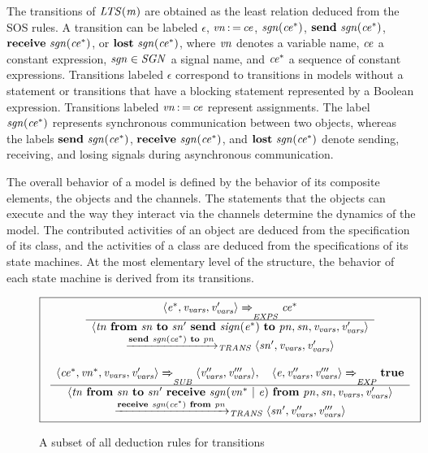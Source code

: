 The transitions of $\it{LTS}(m)$ are obtained as the least relation deduced from the SOS rules.
A transition can be labeled $\epsilon$, $\it{vn\operatorname*{:=}ce}$, $\it{sgn}(\it{ce^*})$, $\textbf{send}~\it{sgn}(\it{ce^*})$, $\textbf{receive}~\it{sgn}(\it{ce^*})$, or $\textbf{lost}~\it{sgn}(\it{ce^*})$, where $\it{vn}$ denotes a variable name, $\it{ce}$ a constant expression, $\it{sgn} \in \it SGN$ a signal name, and $\it{ce^*}$ a sequence of constant expressions.
Transitions labeled $\epsilon$ correspond to transitions in \SLCO models without a statement or transitions that have a blocking statement represented by a Boolean expression.
Transitions labeled $\it{vn\operatorname*{:=}ce}$ represent assignments.
The label $\it{sgn}(\it{ce^*})$ represents synchronous communication between two objects, whereas the labels $\textbf{send}~\it{sgn}(\it{ce^*})$, $\textbf{receive}~\it{sgn}(\it{ce^*})$, and $\textbf{lost}~\it{sgn}(\it{ce^*})$ denote sending, receiving, and losing signals during asynchronous communication.

The overall behavior of a model is defined by the behavior of its composite elements, the objects and the channels.
The statements that the objects can execute and the way they interact via the channels determine the dynamics of the model.
The contributed activities of an object are deduced from the specification of its class, and the activities of a class are deduced from the specifications of its state machines.
At the most elementary level of the structure, the behavior of each state machine is derived from its transitions.

\begin{figure}[hbt]
\centering
{\fontsize{7pt}{0pt}
$
\boxed{
\begin{array}{c}
 \frac{ \begin{array}[c]{c} 
\langle \it{e^*}, v_{\it{vars}}, v_{\it{vars}}' \rangle
\xRightarrow{\it{}}_{\it{EXPS}}
\it{ce^*}
 \end{array} }{ \begin{array}[c]{c} 
\langle \it{tn}~\textbf{from}~\it{sn}~\textbf{to}~\it{sn'}~\textbf{send}~\it{sign}(\it{e^*})~\textbf{to}~\it{pn}, \it{sn}, v_{\it{vars}}, v_{\it{vars}}' \rangle \\
\xrightarrow{\it{\textbf{send}~\it{sgn}(\it{ce^*})~\textbf{to}~\it{pn}}}_{\it{TRANS}}
\langle \it{sn'}, v_{\it{vars}}, v_{\it{vars}}' \rangle
 \end{array} }  \\
\\
 \frac{ \begin{array}[c]{c} 
\langle \it{ce^*}, \it{vn^*}, v_{\it{vars}}, v_{\it{vars}}' \rangle
\xRightarrow{\it{}}_{\it{SUB}}
\langle v_{\it{vars}}'', v_{\it{vars}}''' \rangle, \quad
\langle \it{e}, v_{\it{vars}}'', v_{\it{vars}}''' \rangle
\xRightarrow{\it{}}_{\it{EXP}}
\textbf{true}
 \end{array} }{ \begin{array}[c]{c} 
\langle \it{tn}~\textbf{from}~\it{sn}~\textbf{to}~\it{sn'}~\textbf{receive}~\it{sgn}(\it{vn^*}~|~\it{e})~\textbf{from}~\it{pn}, \it{sn}, v_{\it{vars}}, v_{\it{vars}}' \rangle \\
\xrightarrow{\it{\textbf{receive}~\it{sgn}(\it{ce^*})~\textbf{from}~\it{pn}}}_{\it{TRANS}}
\langle \it{sn'}, v_{\it{vars}}'', v_{\it{vars}}''' \rangle
 \end{array} } 
\end{array}
}
$
}
\caption{A subset of all deduction rules for transitions}
\label{fig:reusable-correct-transformations:transitions}
\end{figure}

